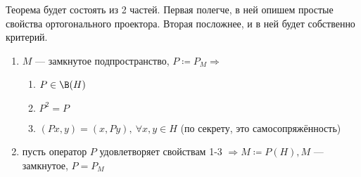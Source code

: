 \documentclass[document]{subfiles}
\begin{document}
\begin{theorem}
    Теорема будет состоять из 2 частей. Первая полегче, в ней опишем простые свойства ортогонального проектора. Вторая посложнее, и в ней будет собственно критерий.
    \begin{enumerate}
        \item $M$ --- замкнутое подпространство, $P \coloneqq P_M \Rightarrow$ 
        \begin{enumerate}
            \item $P \in \B(H)$
            \item $P^2 = P$
            \item $(Px,y) = (x,Py), \: \forall x,y \in  H$ (по секрету, это самосопряжённость) 
        \end{enumerate}
        \item пусть оператор $P$ удовлетворяет свойствам 1-3 $\Rightarrow M \coloneqq P(H), M$ --- замкнутое, $P = P_M$
    \end{enumerate}
\end{theorem}
\end{document}
